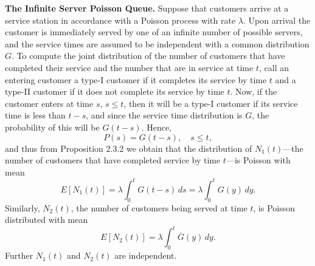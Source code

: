 \documentclass[lang=cn,10pt,thmcnt=section]{elegantbook}
\begin{document}
\begin{example}
	\textbf{The Infinite Server Poisson Queue.} Suppose that customers arrive at a service station in accordance with a Poisson process with rate \(\lambda\). Upon arrival the customer is immediately served by one of an infinite number of possible servers, and the service times are assumed to be independent with a common distribution \( G \). To compute the joint distribution of the number of customers that have completed their service and the number that are in service at time \( t \), call an entering customer a type-I customer if it completes its service by time \( t \) and a type-II customer if it does not complete its service by time \( t \). Now, if the customer enters at time \( s \), \( s \leq t \), then it will be a type-I customer if its service time is less than \( t - s \), and since the service time distribution is \( G \), the probability of this will be \( G(t - s) \). Hence,
	\[
	P(s) = G(t - s), \quad s \leq t,
	\]
	and thus from Proposition 2.3.2 we obtain that the distribution of \( N_1(t) \)—the number of customers that have completed service by time \( t \)—is Poisson with mean
	\[
	E[N_1(t)] = \lambda \int_0^t G(t - s) \, ds = \lambda \int_0^t G(y) \, dy.
	\]
	Similarly, \( N_2(t) \), the number of customers being served at time \( t \), is Poisson distributed with mean
	\[
	E[N_2(t)] = \lambda \int_0^t \overline{G}(y) \, dy.
	\]
	Further \( N_1(t) \) and \( N_2(t) \) are independent.
\end{example}
\end{document}
